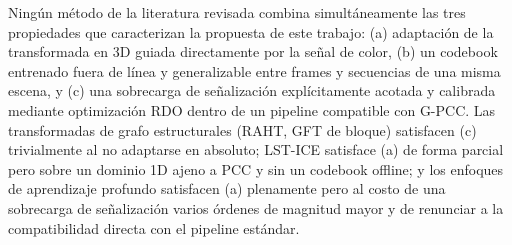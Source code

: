     \begin{table}[H]
        \centering
        \caption{Comparativa de métodos de compresión de atributos para PCC revisados en este capítulo.}
        \label{tab:comparativo_metodos}
        \small
    \end{table}

    Ningún método de la literatura revisada combina simultáneamente las tres propiedades
    que caracterizan la propuesta de este trabajo: (a) adaptación de la transformada en
    3D guiada directamente por la señal de color, (b) un codebook entrenado fuera de línea
    y generalizable entre frames y secuencias de una misma escena, y (c) una sobrecarga de
    señalización explícitamente acotada y calibrada mediante optimización RDO dentro de un
    pipeline compatible con G-PCC. Las transformadas de grafo estructurales (RAHT, GFT de
    bloque) satisfacen (c) trivialmente al no adaptarse en absoluto; LST-ICE satisface (a)
    de forma parcial pero sobre un dominio 1D ajeno a PCC y sin un codebook offline; y los
    enfoques de aprendizaje profundo satisfacen (a) plenamente pero al costo de una
    sobrecarga de señalización varios órdenes de magnitud mayor y de renunciar a la
    compatibilidad directa con el pipeline estándar.

